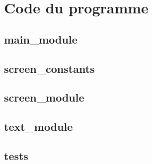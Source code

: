 \documentclass[a4paper,12pt,abstracton,titlepage]{scrartcl}
\begin{document}
\section{Code du programme}
\subsection{main\_module}


\subsection{screen\_constants}


\subsection{screen\_module}


\subsection{text\_module}


\subsection{tests}













\end{document}
